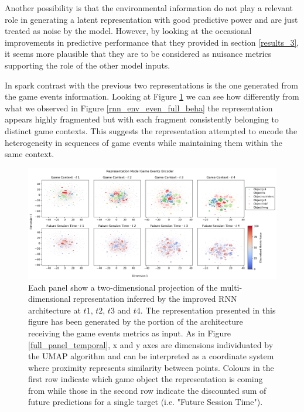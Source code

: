 Another possibility is that the environmental information do not play a relevant role in generating a latent representation with good predictive power and are just treated as noise by the model. However, by looking at the occasional improvements in predictive performance that they provided in section \ref{results_3}, it seems more plausible that they are to be considered as nuisance metrics supporting the role of the other model inputs. 

In spark contrast with the previous two representations is the one generated from the game events information. Looking at Figure \ref{rnn_env_even_full_events} we can see how differently from what we observed in Figure \ref{rnn_env_even_full_beha} the representation appears highly fragmented but with each fragment consistently belonging to distinct game contexts. This suggests the representation attempted to encode the heterogeneity in sequences of game events while maintaining them within the same context.

\begin{figure}[!htb]
\centering
\includegraphics[width=\textwidth]{images/chapter_4/RNN_env_even_0_lstm_layer_events_Future Session Time.png}
\caption[\textbf{Lower dimensional representation of the latent representations generated by the improved version of the RNN architecture from the game events metrics}]{Each panel show a two-dimensional projection of the multi-dimensional representation inferred by the improved RNN architecture at $t1$, $t2$, $t3$ and $t4$. The representation presented in this figure has been generated by the portion of the architecture receiving the game events metrics as input. As in Figure \ref{full_panel_temporal}, x and y axes are dimensions individuated by the UMAP algorithm and can be interpreted as a coordinate system where proximity represents similarity between points. Colours in the first row indicate which game object the representation is coming from while those in the second row indicate the discounted sum of future predictions for a single target (i.e. "Future Session Time").}
\label{rnn_env_even_full_events}
\end{figure}


